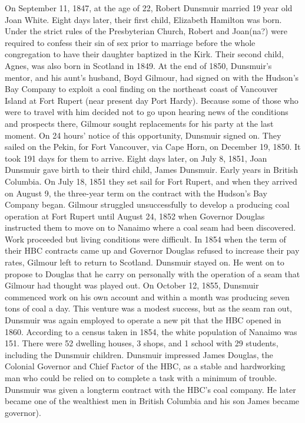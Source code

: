 {On September 11, 1847, at the age of 22, Robert Dunsmuir married 19 year old Joan White. Eight days later, their first child, Elizabeth Hamilton was born. Under the strict rules of the Presbyterian Church, Robert and Joan(na?) were required to confess their sin of sex prior to marriage before the whole congregation to have their daughter baptized in the Kirk. Their second child, Agnes, was also born in Scotland in 1849. At the end of 1850, Dunsmuir's mentor, and his aunt's husband, Boyd Gilmour, had signed on with the Hudson's Bay Company to exploit a coal finding on the northeast coast of Vancouver Island at Fort Rupert (near present day Port Hardy). Because some of those who were to travel with him decided not to go upon hearing news of the conditions and prospects there, Gilmour sought replacements for his party at the last moment. On 24 hours' notice of this opportunity, Dunsmuir signed on. They sailed on the Pekin, for Fort Vancouver, via Cape Horn, on December 19, 1850. It took 191 days for them to arrive. Eight days later, on July 8, 1851, Joan Dunsmuir gave birth to their third child, James Dunsmuir. Early years in British Columbia.  On July 18, 1851 they set sail for Fort Rupert, and when they arrived on August 9, the three-year term on the contract with the Hudson's Bay Company began. Gilmour struggled unsuccessfully to develop a producing coal operation at Fort Rupert until August 24, 1852 when Governor Douglas instructed them to move on to Nanaimo where a coal seam had been discovered. Work proceeded but living conditions were difficult. In 1854 when the term of their HBC contracts came up and Governor Douglas refused to increase their pay rates, Gilmour left to return to Scotland. Dunsmuir stayed on. He went on to propose to Douglas that he carry on personally with the operation of a seam that Gilmour had thought was played out. On October 12, 1855, Dunsmuir commenced work on his own account and within a month was producing seven tons of coal a day. This venture was a modest success, but as the seam ran out, Dunsmuir was again employed to operate a new pit that the HBC opened in 1860.
According to a census taken in 1854, the white population of Nanaimo was 151. There were 52 dwelling houses, 3 shops, and 1 school with 29 students, including the Dunsmuir children. Dunsmuir impressed James Douglas, the Colonial Governor and Chief Factor of the HBC, as a stable and hardworking man who could be relied on to complete a task with a minimum of trouble. Dunsmuir was given a longterm contract with the HBC’s coal company. He later became one of the wealthiest men in British Columbia and his son James became governor).

}
